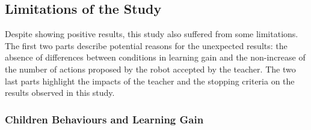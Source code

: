 
\subsection{Limitations of the Study}

Despite showing positive results, this study also suffered from some limitations. The first two parts describe potential reasons for the unexpected results: the absence of differences between conditions in learning gain and the non-increase of the number of actions proposed by the robot accepted by the teacher. The two last parts highlight the impacts of the teacher and the stopping criteria on the results observed in this study.

\subsubsection{Children Behaviours and Learning Gain}

%
%
%

